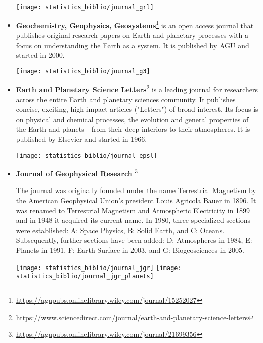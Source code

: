 \begin{itemize}
\begin{center}
\texttt{[image: statistics\_biblio/journal\_grl]}
\end{center}

\item 
{\bf Geochemistry, Geophysics, Geosystems}\footnote{\url{https://agupubs.onlinelibrary.wiley.com/journal/15252027}} 
is an open access journal that publishes original research papers on Earth and planetary 
processes with a focus on understanding the Earth as a system.
It is published by AGU and started in 2000.

\begin{center}
\texttt{[image: statistics\_biblio/journal\_g3]}
\end{center}

\item {\bf Earth and Planetary Science Letters}\footnote{\url{https://www.sciencedirect.com/journal/earth-and-planetary-science-letters}} is a leading journal for researchers across the entire Earth 
and planetary sciences community. It publishes concise, exciting, high-impact articles 
("Letters") of broad interest. Its focus is on physical and chemical processes, the 
evolution and general properties of the Earth and planets - from their deep interiors to their atmospheres. 
It is published by Elsevier and started in 1966.

\begin{center}
\texttt{[image: statistics\_biblio/journal\_epsl]}
\end{center}

\item {\bf Journal of Geophysical Research}
\footnote{\url{https://agupubs.onlinelibrary.wiley.com/journal/21699356}}

The journal was originally founded under the name Terrestrial Magnetism by the 
American Geophysical Union's president Louis Agricola Bauer in 1896.
It was renamed to Terrestrial Magnetism and Atmospheric Electricity in 1899 
and in 1948 it acquired its current name. In 1980, three specialized sections 
were established: 
A: Space Physics, 
B: Solid Earth, and 
C: Oceans. 
Subsequently, further sections have been added: 
D: Atmospheres in 1984, 
E: Planets in 1991,
F: Earth Surface in 2003, and 
G: Biogeosciences in 2005.

\begin{center}
\texttt{[image: statistics\_biblio/journal\_jgr]}
\texttt{[image: statistics\_biblio/journal\_jgr\_planets]}
\end{center}


\end{itemize}
